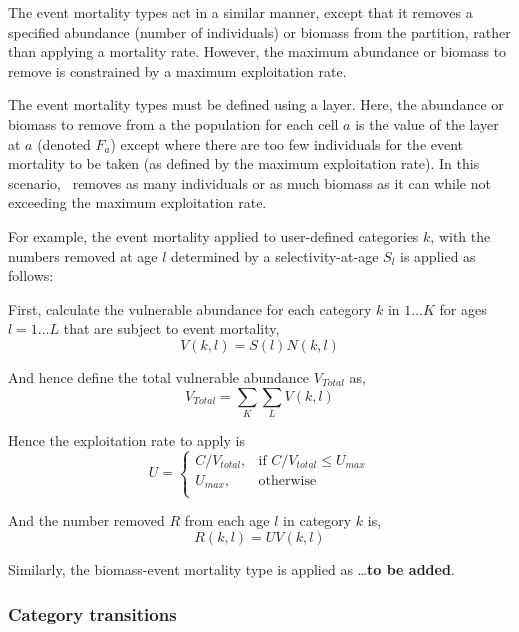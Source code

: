 The event mortality types act in a similar manner, except that it removes a specified abundance (number of individuals) or biomass from the partition, rather than applying a mortality rate. However, the maximum abundance or biomass to remove is constrained by a maximum exploitation rate.

The event mortality types must be defined using a layer. Here, the abundance or biomass to remove from a the population for each cell $a$ is the value of the layer at $a$ (denoted $F_a$) \textemdash except where there are too few individuals for the event mortality to be taken (as defined by the maximum exploitation rate). In this scenario, \SPM\ removes as many individuals or as much biomass as it can while not exceeding the maximum exploitation rate.

For example, the event mortality applied to user-defined categories $k$, with the numbers removed at age $l$ determined by a selectivity-at-age $S_l$ is applied as follows:

First, calculate the vulnerable abundance for each category $k$ in $1 \ldots K$ for ages $l = 1 \ldots L$ that are subject to event mortality,
\begin{equation}
  V(k,l) = S(l) N(k,l)
\end{equation}

And hence define the total vulnerable abundance $V_{Total}$ as,
\begin{equation}
  V_{Total}  = \sum\limits_K {\sum\limits_L {V(k,l)}} 
\end{equation}

Hence the exploitation rate to apply is 
\begin{equation}
U = \begin{cases}
  C/V_{total}, & \text{if $C/V_{total} \leq U_{max}$} \\
  U_{max}, & \text{otherwise}\\ 
  \end{cases} 
\end{equation}

And the number removed $R$ from each age $l$ in category $k$ is,
\begin{equation}
  R(k,l) = UV(k,l)
\end{equation}

Similarly, the biomass-event mortality type is applied as \ldots \textbf{to be added}.

\subsubsection{Category transitions}

